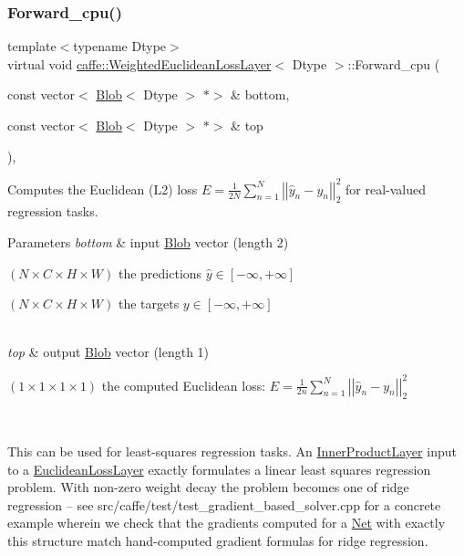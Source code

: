 \subsubsection{\texorpdfstring{Forward\+\_\+cpu()}{Forward\_cpu()}\hspace{0.1cm}{\footnotesize\ttfamily [2/2]}}
{\footnotesize\ttfamily template$<$typename Dtype$>$ \\
virtual void \mbox{\hyperlink{classcaffe_1_1_weighted_euclidean_loss_layer}{caffe\+::\+Weighted\+Euclidean\+Loss\+Layer}}$<$ Dtype $>$\+::Forward\+\_\+cpu (\begin{DoxyParamCaption}\item[{const vector$<$ \mbox{\hyperlink{classcaffe_1_1_blob}{Blob}}$<$ Dtype $>$ $\ast$$>$ \&}]{bottom,  }\item[{const vector$<$ \mbox{\hyperlink{classcaffe_1_1_blob}{Blob}}$<$ Dtype $>$ $\ast$$>$ \&}]{top }\end{DoxyParamCaption})\hspace{0.3cm}{\ttfamily [protected]}, {\ttfamily [virtual]}}



Computes the Euclidean (L2) loss $ E = \frac{1}{2N} \sum\limits_{n=1}^N \left| \left| \hat{y}_n - y_n \right| \right|_2^2 $ for real-\/valued regression tasks. 


\begin{DoxyParams}{Parameters}
{\em bottom} & input \mbox{\hyperlink{classcaffe_1_1_blob}{Blob}} vector (length 2)
\begin{DoxyEnumerate}
\item $ (N \times C \times H \times W) $ the predictions $ \hat{y} \in [-\infty, +\infty]$
\item $ (N \times C \times H \times W) $ the targets $ y \in [-\infty, +\infty]$ 
\end{DoxyEnumerate}\\
\hline
{\em top} & output \mbox{\hyperlink{classcaffe_1_1_blob}{Blob}} vector (length 1)
\begin{DoxyEnumerate}
\item $ (1 \times 1 \times 1 \times 1) $ the computed Euclidean loss\+: $ E = \frac{1}{2n} \sum\limits_{n=1}^N \left| \left| \hat{y}_n - y_n \right| \right|_2^2 $
\end{DoxyEnumerate}\\
\hline
\end{DoxyParams}
This can be used for least-\/squares regression tasks. An \mbox{\hyperlink{classcaffe_1_1_inner_product_layer}{Inner\+Product\+Layer}} input to a \mbox{\hyperlink{classcaffe_1_1_euclidean_loss_layer}{Euclidean\+Loss\+Layer}} exactly formulates a linear least squares regression problem. With non-\/zero weight decay the problem becomes one of ridge regression -- see src/caffe/test/test\+\_\+gradient\+\_\+based\+\_\+solver.\+cpp for a concrete example wherein we check that the gradients computed for a \mbox{\hyperlink{classcaffe_1_1_net}{Net}} with exactly this structure match hand-\/computed gradient formulas for ridge regression.

